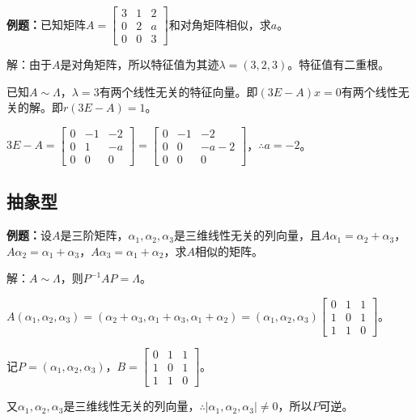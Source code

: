 \documentclass[UTF8, 12pt]{ctexart}
\begin{document}
\textbf{例题：}已知矩阵$A=\left[\begin{array}{ccc}
    3 & 1 & 2 \\
    0 & 2 & a \\
    0 & 0 & 3
\end{array}\right]$和对角矩阵相似，求$a$。\medskip

解：由于$A$是对角矩阵，所以特征值为其迹$\lambda=(3,2,3)$。特征值有二重根。

已知$A\sim\Lambda$，$\lambda=3$有两个线性无关的特征向量。即$(3E-A)x=0$有两个线性无关的解。即$r(3E-A)=1$。

$3E-A=\left[\begin{array}{ccc}
    0 & -1 & -2 \\
    0 & 1 & -a \\
    0 & 0 & 0
\end{array}\right]=\left[\begin{array}{ccc}
    0 & -1 & -2 \\
    0 & 0 & -a-2 \\
    0 & 0 & 0
\end{array}\right]$，$\therefore a=-2$。

\subsection{抽象型}

\textbf{例题：}设$A$是三阶矩阵，$\alpha_1,\alpha_2,\alpha_3$是三维线性无关的列向量，且$A\alpha_1=\alpha_2+\alpha_3$，$A\alpha_2=\alpha_1+\alpha_3$，$A\alpha_3=\alpha_1+\alpha_2$，求$A$相似的矩阵。

解：$A\sim\Lambda$，则$P^{-1}AP=\Lambda$。

$A(\alpha_1,\alpha_2,\alpha_3)=(\alpha_2+\alpha_3,\alpha_1+\alpha_3,\alpha_1+\alpha_2)=(\alpha_1,\alpha_2,\alpha_3)\left[\begin{array}{ccc}
    0 & 1 & 1 \\
    1 & 0 & 1 \\
    1 & 1 & 0
\end{array}\right]$。

记$P=(\alpha_1,\alpha_2,\alpha_3)$，$B=\left[\begin{array}{ccc}
    0 & 1 & 1 \\
    1 & 0 & 1 \\
    1 & 1 & 0
\end{array}\right]$。\medskip

又$\alpha_1,\alpha_2,\alpha_3$是三维线性无关的列向量，$\therefore\vert\alpha_1,\alpha_2,\alpha_3\vert\neq0$，所以$P$可逆。
\end{document}
